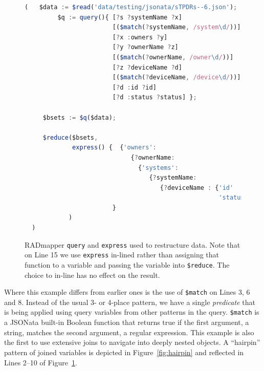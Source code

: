 \documentclass[10pt,letterpaper]{article} %
\newcommand{\stt}[1]{\texttt{#1}} %
\begin{document}
\begin{figure}[H]
  \caption{RADmapper \stt{query} and \stt{express} used to restructure data.
    Note that on Line 15 we use \stt{express} in-lined rather than assigning that function to a variable and passing the variable into \stt{\$reduce}. The choice to in-line has no effect on the result.}
 \label{code:restruct}
\begin{lstlisting}[language=JavaScript,basicstyle=\ttfamily\scriptsize,numberstyle=\scriptsize]
  (   $data := $read('data/testing/jsonata/sTPDRs--6.json');
         $q := query(){ [?s ?systemName ?x]
                        [($match(?systemName, /system\d/))]
                        [?x :owners ?y]
                        [?y ?ownerName ?z]
                        [($match(?ownerName, /owner\d/))]
                        [?z ?deviceName ?d]
                        [($match(?deviceName, /device\d/))]
                        [?d :id ?id]
                        [?d :status ?status] };

     $bsets := $q($data);

     $reduce($bsets,
             express() {  {'owners':
                             {?ownerName:
                               {'systems':
                                  {?systemName:
                                     {?deviceName : {'id'     : ?id,
                                                     'status' : ?status}}}}}}
                        }
            )
  )
\end{lstlisting}
\end{figure} \vspace{-2em}

Where this example differs from earlier ones is the use of \stt{\$match} on Lines 3, 6 and 8.
Instead of the usual 3- or 4-place pattern, we have a single \textit{predicate} that is being applied using query variables from other patterns in the query.
\stt{\$match} is a JSONata built-in Boolean function that returns true if the first argument, a string, matches the second argument, a regular expression.
This example is also the first to use extensive joins to navigate into deeply nested objects.
A ``hairpin'' pattern of joined variables is depicted in Figure~\ref{fig:hairpin} and reflected in Lines 2--10 of Figure~\ref{code:restruct}.
\end{document}
